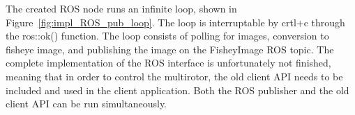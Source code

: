 The created ROS node runs an infinite loop, shown in Figure~\ref{fig:impl_ROS_pub_loop}. The loop is interruptable by crtl+c through the ros::ok() function. The loop consists of polling for images, conversion to fisheye image, and publishing the image on the FisheyImage ROS topic. The complete implementation of the ROS interface is unfortunately not finished, meaning that in order to control the multirotor, the old client API needs to be included and used in the client application. Both the ROS publisher and the old client API can be run simultaneously.






\cleardoublepage